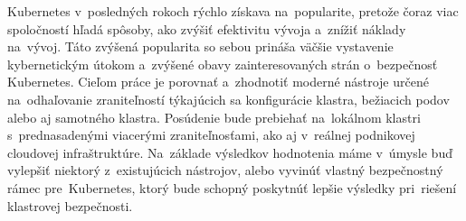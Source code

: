 Kubernetes v posledných rokoch rýchlo získava na popularite, pretože čoraz viac spoločností hľadá spôsoby, ako zvýšiť efektivitu vývoja a znížiť náklady na vývoj. Táto zvýšená popularita so sebou prináša väčšie vystavenie kybernetickým útokom a zvýšené obavy zainteresovaných strán o bezpečnosť Kubernetes.
Cieľom práce je porovnať a zhodnotiť moderné nástroje určené na odhaľovanie zraniteľností týkajúcich sa konfigurácie klastra, bežiacich podov alebo aj samotného klastra. Posúdenie bude prebiehať na lokálnom klastri s prednasadenými viacerými zraniteľnosťami, ako aj v reálnej podnikovej cloudovej infraštruktúre. Na základe výsledkov hodnotenia máme v úmysle buď vylepšiť niektorý z existujúcich nástrojov, alebo vyvinúť vlastný bezpečnostný rámec pre Kubernetes, ktorý bude schopný poskytnúť lepšie výsledky pri riešení klastrovej bezpečnosti.